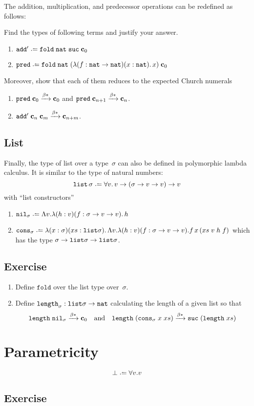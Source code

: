 The addition, multiplication, and predecessor operations can be redefined as
follows:
\begin{example}
  Find the types of following terms and justify your answer.
  \begin{enumerate}
    \item $\add' \defeq \mathtt{fold}\;\nat\;\suc\;\bc_0$
    \item $\pred \defeq \mathtt{fold}\;\nat\;(\lambda (f : \nat \to \nat)(x : \nat).\,
      x)\;\bc_0$
  \end{enumerate}
  Moreover, show that each of them reduces to the expected Church numerals
  \begin{enumerate}
    \item $\mathtt{pred}\;\mathbf{c}_0 \xrightarrow{\beta*} \mathbf{c}_0$ and $\mathtt{pred}\;\mathbf{c}_{n+1}
      \xrightarrow{\beta*} \mathbf{c}_n$.
    \item $\mathtt{add}'\;\mathbf{c}_n\;\mathbf{c}_m \xrightarrow{\beta*} \mathbf{c}_{n+m}$.
  \end{enumerate}
\end{example}
\subsection{List}
Finally, the type of list over a type~$\sigma$ can also be defined in
polymorphic lambda calculus. It is similar to the type of natural numbers:
\[
  \List\,\sigma\defeq \forall v.\, v \to (\sigma \to v \to v) \to v 
\]
with ``list constructors'' 
\begin{enumerate}
  \item $\mathtt{nil}_\sigma \defeq \Lambda v.\lambda (h : v)(f :
    \sigma\to v \to v).\, h$
  \item $\mathtt{cons}_\sigma \defeq \lambda (x : \sigma)(xs : \List
    \sigma).\,\Lambda v.\lambda(h : v)(f : \sigma\to v \to v).f\,x\,(xs\; v\;
    h\; f)$ which has the type $\sigma \to \mathtt{list} \sigma \to  \mathtt{list} \sigma$.
  \end{enumerate}
\subsection*{Exercise}
\begin{enumerate}
  \item Define $\mathtt{fold}$ over the list type over~$\sigma$.
  \item Define $\mathtt{length}_{\sigma} : \mathtt{list} \sigma \to \mathtt{nat}$ calculating
    the length of a given list so that
    \[
      \mathtt{length}\;\mathtt{nil}_\sigma \xrightarrow{\beta*} \mathbf{c}_0
      \quad\text{and}\quad
      \mathtt{length}\;(\mathtt{cons}_\sigma\;x\;xs)
      \xrightarrow{\beta*} \mathtt{suc}\;(\mathtt{length}\;xs) 
    \]
  \end{enumerate}

\section{Parametricity}

\[
  \bot \defeq \forall v.v
\]
\subsection*{Exercise}



